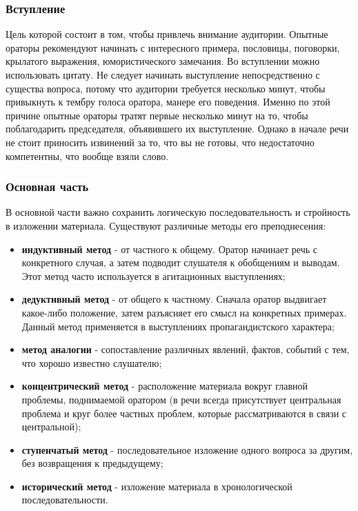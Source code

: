 \subsubsection{Вступление}
Цель которой состоит в том, чтобы привлечь внимание аудитории. Опытные ораторы рекомендуют начинать с интересного примера, пословицы, поговорки, крылатого выражения, юмористического замечания. Во вступлении можно использовать цитату. Не следует начинать выступление непосредственно с существа вопроса, потому что аудитории требуется несколько минут, чтобы
привыкнуть к тембру голоса оратора, манере его поведения. Именно по этой причине опытные ораторы тратят первые несколько минут на то, чтобы поблагодарить председателя, объявившего их выступление. Однако в начале речи не стоит приносить извинений за то, что вы не готовы, что недостаточно компетентны, что вообще
взяли слово.
\subsubsection{Основная часть}
В основной части важно сохранить логическую последовательность и стройность в изложении материала. Существуют различные методы его преподнесения:
\begin{itemize}
	\item \textbf{индуктивный метод} - от частного к общему. Оратор начинает речь с конкретного случая, а затем подводит слушателя к
	обобщениям и выводам. Этот метод часто используется в агитационных выступлениях;
	\item \textbf{дедуктивный метод} - от общего к частному. Сначала
	оратор выдвигает какое-либо положение, затем разъясняет его
	смысл на конкретных примерах. Данный метод применяется в выступлениях пропагандистского характера;
	\item \textbf{метод аналогии} - сопоставление различных явлений,
	фактов, событий с тем, что хорошо известно слушателю;
	\item \textbf{концентрический метод} - расположение материала вокруг главной проблемы, поднимаемой оратором (в речи всегда присутствует центральная проблема и круг более частных проблем, которые рассматриваются в связи с центральной);
	\item \textbf{ступенчатый метод} - последовательное изложение одного вопроса за другим, без возвращения к предыдущему;
	\item \textbf{исторический метод} - изложение материала в хронологической последовательности.
\end{itemize}


